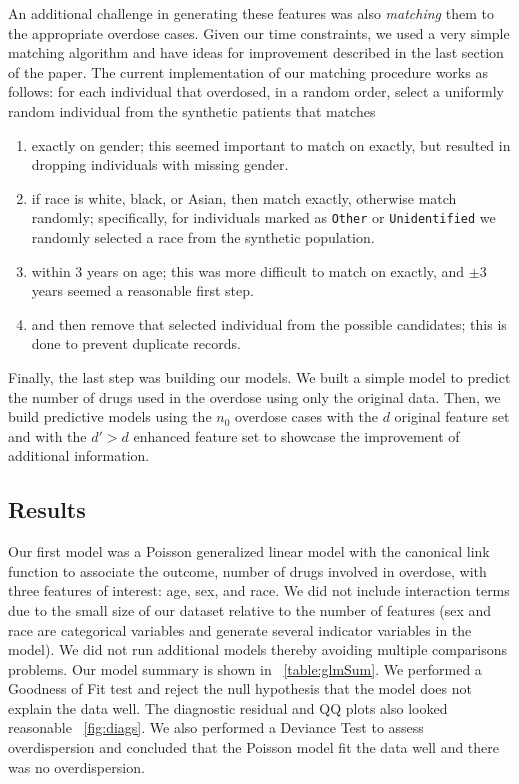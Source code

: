 \documentclass{article}
\begin{document}
An additional challenge in generating these features was also {\it matching} them to the appropriate overdose cases. Given our time constraints, we used a very simple matching algorithm and have ideas for improvement described in the last section of the paper. The current implementation of our matching procedure works as follows: for each individual that overdosed, in a random order, select a uniformly random individual from the synthetic patients that matches
\begin{enumerate}
\item exactly on gender; this seemed important to match on exactly, but resulted in dropping individuals with missing gender.
\item if race is white, black, or Asian, then match exactly, otherwise match randomly; specifically, for individuals marked as \texttt{Other} or \texttt{Unidentified} we randomly selected a race from the synthetic population.
\item within 3 years on age; this was more difficult to match on exactly, and $\pm$3 years seemed a reasonable first step.
\item and then remove that selected individual from the possible candidates; this is done to prevent duplicate records.
\end{enumerate}

Finally, the last step was building our models. We built a simple model to predict the number of drugs used in the overdose using only the original data. Then, we build predictive models using the $n_0$ overdose cases with the $d$ original feature set and with the $d' > d$ enhanced feature set to showcase the improvement of additional information.

\subsection{Results}

Our first model was a Poisson generalized linear model with the canonical link function to associate the outcome, number of drugs involved in overdose, with three features of interest: age, sex, and race. We did not include interaction terms due to the small size of our dataset relative to the number of features (sex and race are categorical variables and generate several indicator variables in the model). We did not run additional models thereby avoiding multiple comparisons problems. Our model summary is shown in ~\ref{table:glmSum}. We performed a Goodness of Fit test and reject the null hypothesis that the model does not explain the data well. The diagnostic residual and QQ plots also looked reasonable ~\ref{fig:diags}. We also performed a Deviance Test to assess overdispersion and concluded that the Poisson model fit the data well and there was no overdispersion.
\end{document}
